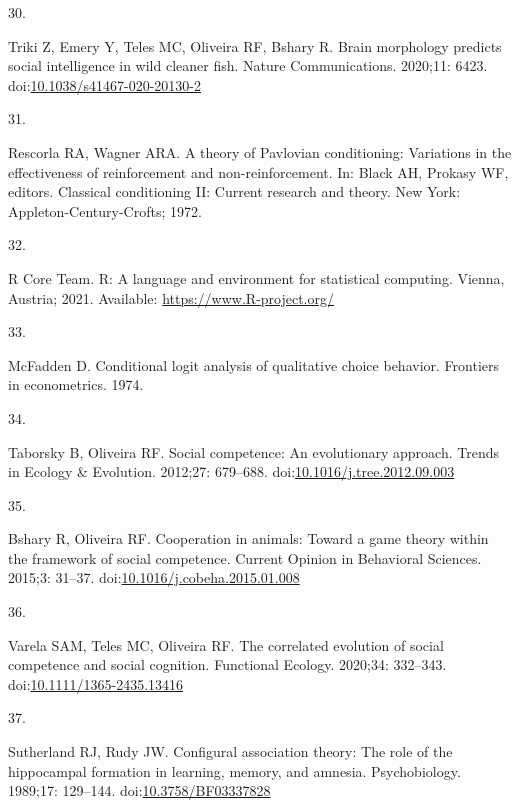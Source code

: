 \documentclass[10pt,letterpaper]{article}
\newlength{\cslhangindent}
\newlength{\csllabelwidth}
\newlength{\cslentryspacingunit} %
\newenvironment{CSLReferences}[2] %
 {%
  \setlength{\parindent}{0pt}
  \ifodd #1
  \let\oldpar\par
  \def\par{\hangindent=\cslhangindent\oldpar}
  \fi
  \setlength{\parskip}{#2\cslentryspacingunit}
 }%
 {}
\newcommand{\CSLLeftMargin}[1]{\parbox[t]{\csllabelwidth}{#1}}
\newcommand{\CSLRightInline}[1]{\parbox[t]{\linewidth - \csllabelwidth}{#1}\break}
\begin{document}
\begin{CSLReferences}{0}{0}
\leavevmode{}%
\CSLLeftMargin{30. }
\CSLRightInline{Triki Z, Emery Y, Teles MC, Oliveira RF, Bshary R. Brain
morphology predicts social intelligence in wild cleaner fish. Nature
Communications. 2020;11: 6423.
doi:\href{https://doi.org/10.1038/s41467-020-20130-2}{10.1038/s41467-020-20130-2}}

\leavevmode{}%
\CSLLeftMargin{31. }
\CSLRightInline{Rescorla RA, Wagner ARA. A theory of {Pavlovian}
conditioning: Variations in the effectiveness of reinforcement and
non-reinforcement. In: Black AH, Prokasy WF, editors. Classical
conditioning {II}: Current research and theory. New York:
Appleton-Century-Crofts; 1972. }

\leavevmode{}%
\CSLLeftMargin{32. }
\CSLRightInline{R Core Team. R: {A} language and environment for
statistical computing. Vienna, Austria; 2021. Available:
\url{https://www.R-project.org/}}

\leavevmode{}%
\CSLLeftMargin{33. }
\CSLRightInline{McFadden D. Conditional logit analysis of qualitative
choice behavior. Frontiers in econometrics. 1974. }

\leavevmode{}%
\CSLLeftMargin{34. }
\CSLRightInline{Taborsky B, Oliveira RF. Social competence: An
evolutionary approach. Trends in Ecology \& Evolution. 2012;27:
679--688.
doi:\href{https://doi.org/10.1016/j.tree.2012.09.003}{10.1016/j.tree.2012.09.003}}

\leavevmode{}%
\CSLLeftMargin{35. }
\CSLRightInline{Bshary R, Oliveira RF. Cooperation in animals: Toward a
game theory within the framework of social competence. Current Opinion
in Behavioral Sciences. 2015;3: 31--37.
doi:\href{https://doi.org/10.1016/j.cobeha.2015.01.008}{10.1016/j.cobeha.2015.01.008}}

\leavevmode{}%
\CSLLeftMargin{36. }
\CSLRightInline{Varela SAM, Teles MC, Oliveira RF. The correlated
evolution of social competence and social cognition. Functional Ecology.
2020;34: 332--343.
doi:\href{https://doi.org/10.1111/1365-2435.13416}{10.1111/1365-2435.13416}}

\leavevmode{}%
\CSLLeftMargin{37. }
\CSLRightInline{Sutherland RJ, Rudy JW. Configural association theory:
{The} role of the hippocampal formation in learning, memory, and
amnesia. Psychobiology. 1989;17: 129--144.
doi:\href{https://doi.org/10.3758/BF03337828}{10.3758/BF03337828}}


\end{CSLReferences}
\end{document}
